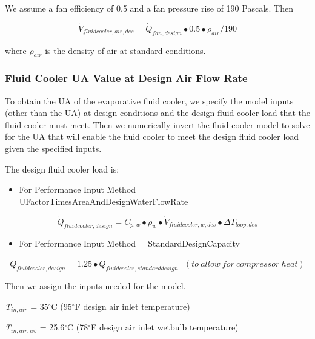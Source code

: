 We assume a fan efficiency of 0.5 and a fan pressure rise of 190 Pascals. Then

\begin{equation}
{\dot V_{fluidcooler,air,des}} = {\dot Q_{fan,design}} \bullet 0.5 \bullet {\rho_{air}}/190
\end{equation}

where \(\rho_{air}\) is the density of air at standard conditions.

\subsubsection{Fluid Cooler UA Value at Design Air Flow Rate}\label{fluid-cooler-ua-value-at-design-air-flow-rate-1}

To obtain the UA of the evaporative fluid cooler, we specify the model inputs (other than the UA) at design conditions and the design fluid cooler load that the fluid cooler must meet. Then we numerically invert the fluid cooler model to solve for the UA that will enable the fluid cooler to meet the design fluid cooler load given the specified inputs.

The design fluid cooler load is:

\begin{itemize}
\tightlist
\item
  For Performance Input Method = UFactorTimesAreaAndDesignWaterFlowRate
\end{itemize}

\begin{equation}
{\dot Q_{fluidcooler,design}} = {C_{p,w}} \bullet {\rho_w} \bullet {\dot V_{fluidcooler,w,des}} \bullet \Delta {T_{loop,des}}
\end{equation}

\begin{itemize}
\tightlist
\item
  For Performance Input Method = StandardDesignCapacity
\end{itemize}

\begin{equation}
{\dot Q_{fluidcooler,design}} = 1.25 \bullet {\dot Q_{fluidcooler,standarddesign}}~~~(to~allow~for~compressor~heat)
\end{equation}

Then we assign the inputs needed for the model.

\emph{T\(_{in,air}\)} = 35\(^{\circ}\)C (95\(^{\circ}\)F design air inlet temperature)

\emph{T\(_{in,air,wb}\)} = 25.6\(^{\circ}\)C (78\(^{\circ}\)F design air inlet wetbulb temperature)


